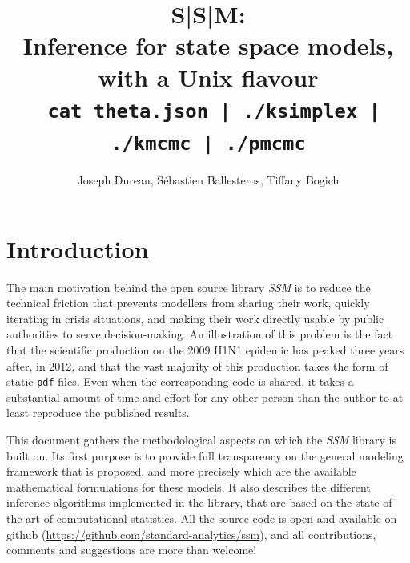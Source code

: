 \documentclass[a4paper,11pt,titlepage]{article}
\theoremstyle{plain} %
\begin{document}
\vspace{2 cm} 
\title{S|S|M:\\ Inference for state space models,\\ with a Unix flavour\\ \vspace{1 cm} {\large \texttt{ cat theta.json | ./ksimplex | ./kmcmc | ./pmcmc}}}


\author{Joseph Dureau, S\'ebastien Ballesteros, Tiffany Bogich}

\maketitle


\section{Introduction}

The main motivation behind the open source library \emph{SSM} is to reduce the technical friction that prevents modellers from sharing their work, quickly iterating in crisis situations, and making their work directly usable by public authorities to serve decision-making.
An illustration of this problem is the fact that the scientific production on the 2009 H1N1 epidemic has peaked three years after, in  2012, and that the vast majority of this production takes the form of static  \texttt{pdf} files. Even when the corresponding code is shared, it takes a substantial amount of time and effort for any other person than the author to at least reproduce the published results. 

This document gathers the methodological aspects on which the \emph{SSM} library is built on. Its first purpose is to provide full transparency on the general modeling framework that is proposed, and more precisely which are the available mathematical formulations for these models. It also describes the different inference algorithms implemented in the library, that are based on the state of the art of computational statistics.  All the source code is open and available on github (\href{https://github.com/standard-analytics/ssm}{https://github.com/standard-analytics/ssm}), and all contributions, comments and suggestions are more than welcome!
\end{document}
